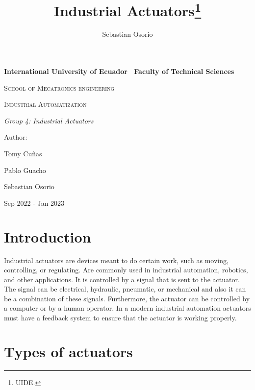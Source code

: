 \documentclass[runningheads]{llncs}
\begin{document}
\begin{titlepage}
\centering
{\bfseries\LARGE International University of Ecuador \ 
Faculty of Technical Sciences  \par}
\vspace{1cm}
{\scshape\Large School of Mecatronics engineering \par}
\vspace{3cm}
{\scshape\Huge Industrial Automatization \par}
\vspace{3cm}
{\itshape\Large Group 4: Industrial Actuators \par}
\vfill
{\Large Author: \par}
{\Large Tomy Cuñas\par Pablo Guacho \par Sebastian Osorio \par}
\vfill
{\Large Sep 2022 - Jan 2023 \par}
\end{titlepage}
\newpage
%
\title{Industrial Actuators\thanks{UIDE.}}
%
\author{Sebastian Osorio }



\maketitle


\section{Introduction}
Industrial actuators are devices meant to do certain work, such as moving, controlling, or regulating. 
Are commonly used in industrial automation, robotics, and other applications.
It is controlled by a signal that is sent to the actuator. The signal can be electrical, hydraulic, pneumatic, or mechanical and
also it can be a combination of these signals\cite{RobotsYuk2017hydraulic}. Furthermore, the actuator can be controlled by a computer or by a human operator.
In a modern industrial automation actuators must have a feedback system to ensure that the actuator is working properly.

\section{Types of actuators}
\end{document}
